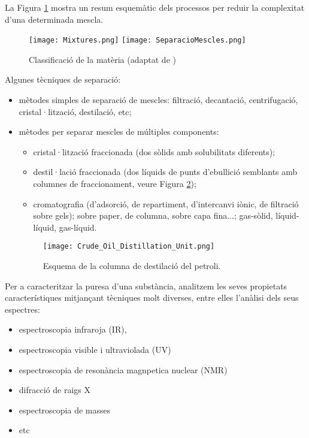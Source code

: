 La Figura \ref{fig:SeparacioMescles} mostra un resum esquemàtic dels processos per reduir la complexitat d'una determinada mescla.

\begin{figure}[h]
\centering
\texttt{[image: Mixtures.png]}
\texttt{[image: SeparacioMescles.png]}
\caption{Classificació de la matèria (adaptat de \cite{caamano_ros_quimica_1991})}
\label{fig:SeparacioMescles}
\end{figure}

Algunes tècniques de separació:
\begin{itemize}
\item mètodes simples de separació de mescles: filtració, decantació, centrifugació, cristal·lització, destilació, etc;
\item mètodes per separar mescles de múltiples components: 
\begin{itemize}
\item cristal·lització fraccionada (dos sòlids amb solubilitats diferents);
\item destil·lació fraccionada (dos líquids de punts d'ebullició semblants amb columnes de fraccionament, veure Figura \ref{fig:Crude_Oil_Distillation_Unit});
\item cromatografia (d'adsorció, de repartiment, d'intercanvi iònic, de filtració sobre gels); sobre paper, de columna, sobre capa fina...; gas-sòlid, líquid-líquid, gas-líquid.
\end{itemize}  
\begin{figure}[h]
\centering
\texttt{[image: Crude\_Oil\_Distillation\_Unit.png]}
\caption{Esquema de la columna de destilació del petroli.}
\label{fig:Crude_Oil_Distillation_Unit}
\end{figure}
\end{itemize}

Per a caracteritzar la puresa d'una substància, analitzem les seves propietats característiques mitjançant tècniques molt diverses, entre elles l'anàlisi dels seus espectres:
\begin{itemize}
\item espectroscopia infraroja (IR), 
\item espectroscopia visible i ultraviolada (UV)
\item espectroscopia de resonància magnpetica nuclear (NMR)
\item difracció de raigs X
\item espectroscopia de masses
\item etc
\end{itemize}

